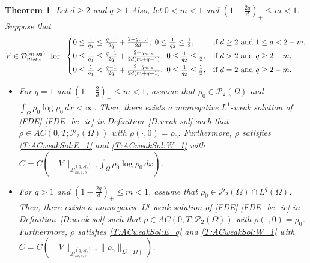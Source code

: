 \documentclass{amsart}
\newtheorem{theorem}[defn]{Theorem}
\numberwithin{equation}{section}
\begin{document}
\begin{theorem}\label{T:ACweakSol:divfree}
Let $d\geq 2$ and $q\geq 1$.Also, let $0<m<1$ and $ (1-\frac{2q}{d})_{+} \leq m < 1$. Suppose that 
\begin{equation}\label{T:ACweakSol:divfree:Vq}
\begin{aligned}
		 V \in \mathcal{D}_{m,q,s}^{(q_1,q_2)} 
		\  \text{ for } \ 
	\begin{cases}
0 \leq \frac{1}{q_1} \leq \frac{q-1}{2q}+\frac{2+q_{m,d}}{2d},\ 0 \leq \frac{1}{q_2} \leq \frac{1}{2}, &\text{if }  d\geq 2  \text{ and }  1 \leq q<2-m,
\vspace{1mm}\\
	0 \leq \frac{1}{q_1} \leq \frac{q-1}{2q}+\frac{2+q_{m,d}}{2d(m+q-1)}, \ 0 \leq \frac{1}{q_2} \leq \frac{1}{2}, &\text{if } d>2 \text{ and } q \geq 2-m,  \vspace{1 mm} \\
	 0 \leq \frac{1}{q_1} < \frac{q-1}{2q}+\frac{2+q_{m,d}}{2d(m+q-1)}, \ 0 \leq \frac{1}{q_2} \leq \frac{1}{2}, &\text{if }  d=2 \text{ and } q \geq 2-m.  
\end{cases}
\end{aligned}
\end{equation}

\begin{itemize}
\item[(i)] For $q=1$ and $ (1-\frac{2}{d})_{+} \leq m < 1$, assume that $\rho_0 \in  \mathcal{P}_2(\Omega)$ and $\int_{\Omega} \rho_0 \log \rho_0 \,dx < \infty$. 
Then, there exists a nonnegative $L^1$-weak solution of \eqref{FDE}-\eqref{FDE_bc_ic} in Definition~\ref{D:weak-sol} such that  $\rho \in AC(0,T; \mathcal{P}_2 (\Omega))$ with $\rho(\cdot, 0)=\rho_0$.
Furthermore, $\rho$ satisfies \eqref{T:ACweakSol:E_1} and \eqref{T:ACweakSol:W_1}
with $C = C (\|V\|_{\mathcal{D}_{m,1,s}^{(q_1,q_2)}}, \int_{\Omega} \rho_0 \log \rho_0 \,dx )$.
\smallskip 

\item[(ii)]
For $q>1$ and $ (1-\frac{2q}{d})_{+} \leq m < 1$, assume that $\rho_0 \in  \mathcal{P}_2(\Omega) \cap L^{q}(\Omega)$. 
Then, there exists a nonnegative $L^q$-weak solution of \eqref{FDE}-\eqref{FDE_bc_ic} in Definition~\ref{D:weak-sol} such that  $\rho \in AC(0,T; \mathcal{P}_2 (\Omega))$ with $\rho(\cdot, 0)=\rho_0$.
Furthermore, $\rho$ satisfies \eqref{T:ACweakSol:E_q}
and \eqref{T:ACweakSol:W_1}
with $C = C (\|V\|_{\mathcal{D}_{m,q,s}^{(q_1,q_2)}}, \|\rho_{0}\|_{L^{q} (\Omega)})$.
\end{itemize}
\end{theorem}
\end{document}
